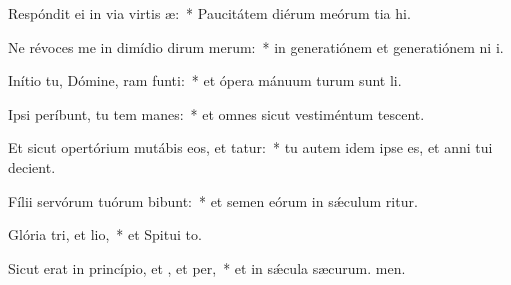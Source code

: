 \item Respóndit ei in via virtis æ:~* Paucitátem diérum meórum tia hi.
\item Ne révoces me in dimídio dirum merum:~* in generatiónem et generatiónem ni i.
\item Inítio tu, Dómine, ram funti:~* et ópera mánuum turum sunt li.
\item Ipsi períbunt, tu tem manes:~* et omnes sicut vestiméntum tescent.
\item Et sicut opertórium mutábis eos, et tatur:~* tu autem idem ipse es, et anni tui  decient.
\item Fílii servórum tuórum bibunt:~* et semen eórum in sǽculum ritur.
\item Glória tri, et lio,~* et Spitui to.
\item Sicut erat in princípio, et , et per,~* et in sǽcula sæcurum. men.

